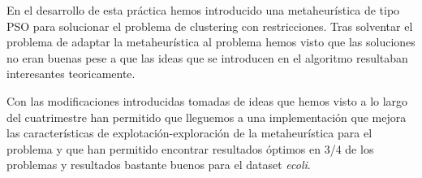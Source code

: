 \documentclass[11pt]{article}
\begin{document}
En el desarrollo de esta práctica hemos introducido una metaheurística de tipo
PSO para solucionar el problema de clustering con restricciones. Tras solventar
el problema de adaptar la metaheurística al problema hemos visto que las
soluciones no eran buenas pese a que las ideas que se introducen en el algoritmo
resultaban interesantes teoricamente. 

Con las modificaciones introducidas tomadas de ideas que hemos visto a lo largo
del cuatrimestre han permitido que lleguemos a una implementación que mejora las
características de explotación-exploración de la metaheurística para el problema
y que han permitido encontrar resultados óptimos en 3/4 de los problemas y
resultados bastante buenos para el dataset \textit{ecoli}.



\end{document}
